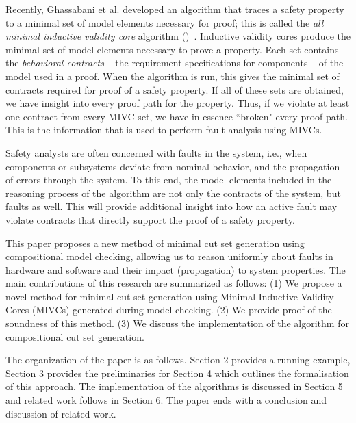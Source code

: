 Recently, Ghassabani et al. developed an algorithm that traces a safety property to a minimal set of model elements necessary for proof; this is called the \textit{all minimal inductive validity core} algorithm (\aivcalg)~\cite{GhassabaniGW16,Ghassabani2017EfficientGO,bendik2018online}. Inductive validity cores produce the minimal set of model elements necessary to prove a property. Each set contains the \emph{behavioral contracts} -- the requirement specifications for components -- of the model used in a proof. When the \aivcalg algorithm is run, this gives the minimal set of contracts required for proof of a safety property. If all of these sets are obtained, we have insight into every proof path for the property. Thus, if we violate at least one contract from every MIVC set, we have in essence ``broken" every proof path. This is the information that is used to perform fault analysis using MIVCs.


Safety analysts are often concerned with faults in the system, i.e., when components or subsystems deviate from nominal behavior, and the propagation of errors through the system. To this end, the model elements included in the reasoning process of the \aivcalg algorithm are not only the contracts of the system, but faults as well. This will provide additional insight into how an active fault may violate contracts that directly support the proof of a safety property. 

This paper proposes a new method of minimal cut set generation using compositional model checking, allowing us to reason uniformly about faults in hardware and software and their impact (propagation) to system properties. The main contributions of this research are summarized as follows: (1) We propose a novel method for minimal cut set generation using Minimal Inductive Validity Cores (MIVCs) generated during model checking. %
(2) We provide proof of the soundness of this method. (3) We discuss the implementation of the algorithm for compositional cut set generation.

The organization of the paper is as follows.  Section 2 provides a running example, Section 3 provides the preliminaries for Section 4 which outlines the formalisation of this approach. The implementation of the algorithms is discussed in Section 5 and related work follows in Section 6. The paper ends with a conclusion and discussion of related work.
